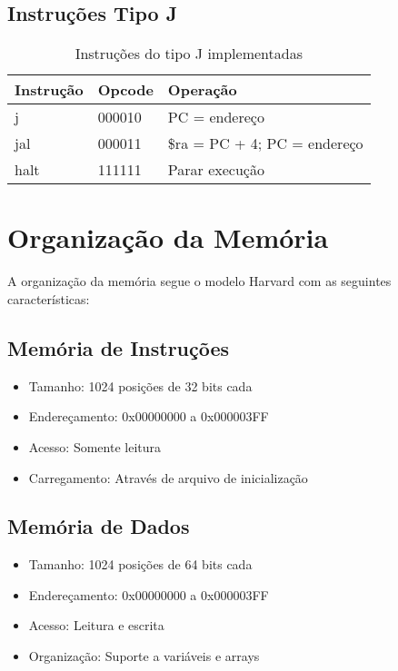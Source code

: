 \documentclass[
	12pt,				%
	oneside,
	a4paper,			%
	english,			%
	french,				%
	spanish,			%
	brazil,				%
	]{abntex2}
\begin{document}
\subsection{Instruções Tipo J}

\begin{table}[H]
\centering
\caption{Instruções do tipo J implementadas}
\begin{tabular}{|l|l|l|}
\hline
\textbf{Instrução} & \textbf{Opcode} & \textbf{Operação} \\
\hline
j & 000010 & PC = endereço \\
\hline
jal & 000011 & \$ra = PC + 4; PC = endereço \\
\hline
halt & 111111 & Parar execução \\
\hline
\end{tabular}
\end{table}

\section{Organização da Memória}

A organização da memória segue o modelo Harvard com as seguintes características:

\subsection{Memória de Instruções}
\begin{itemize}
    \item Tamanho: 1024 posições de 32 bits cada
    \item Endereçamento: 0x00000000 a 0x000003FF
    \item Acesso: Somente leitura
    \item Carregamento: Através de arquivo de inicialização
\end{itemize}

\subsection{Memória de Dados}
\begin{itemize}
    \item Tamanho: 1024 posições de 64 bits cada
    \item Endereçamento: 0x00000000 a 0x000003FF
    \item Acesso: Leitura e escrita
    \item Organização: Suporte a variáveis e arrays
\end{itemize}
\end{document}
